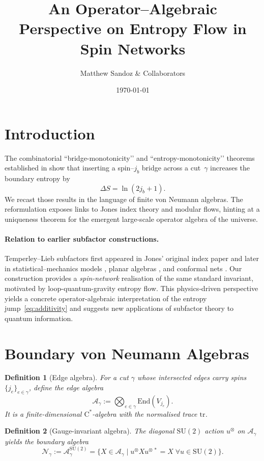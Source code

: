 \documentclass[11pt]{article}
\newtheorem{definition}{Definition}[section]
\begin{document}
\title{An Operator–Algebraic Perspective on Entropy Flow in Spin Networks}
\author{\small Matthew Sandoz \& Collaborators}
\date{\today}
\maketitle

\section{Introduction}
The combinatorial “bridge-monotonicity’’ and “entropy-monotonicity’’ theorems
established in \cite{BridgeMono,EntropyMono}
show that inserting a spin–$j_b$ bridge across a cut~$\gamma$ increases the
boundary entropy by
\[
  \Delta S = \ln(2j_b+1).
\]
We recast those results in the language of finite von Neumann algebras.  
The reformulation exposes links to Jones index theory and modular flows, hinting
at a uniqueness theorem for the emergent large-scale operator algebra of the
universe.

\paragraph{Relation to earlier subfactor constructions.}
Temperley--Lieb subfactors first appeared in Jones’ original index
paper \cite{Jones1983} and later in statistical–mechanics models
\cite{KauffmanLins}, planar algebras \cite{JonesPA}, and conformal nets
\cite{KawahigashiLongo}.  
Our construction provides a \emph{spin-network} realisation of the same
standard invariant, motivated by loop-quantum-gravity entropy flow.
This physics‐driven perspective yields a concrete operator-algebraic
interpretation of the entropy jump~\eqref{eq:additivity} and suggests
new applications of subfactor theory to quantum information.


\section{Boundary von Neumann Algebras}

\begin{definition}[Edge algebra]
For a cut $\gamma$ whose intersected edges carry spins
$\{j_e\}_{e\in\gamma}$, define the \emph{edge algebra}
\[
  \mathcal A_{\gamma} := \bigotimes_{e\in\gamma} \mathrm{End}(V_{j_e}).
\]
It is a finite-dimensional $\mathrm C^\ast$-algebra with the normalised trace
$\mathrm{tr}$.
\end{definition}

\begin{definition}[Gauge-invariant algebra]
The diagonal $\mathrm{SU}(2)$ action $u^{\otimes}$ on
$\mathcal A_\gamma$ yields the \emph{boundary algebra}
\[
  \mathcal N_{\gamma} := 
  \mathcal A_{\gamma}^{\mathrm{SU}(2)}
  =
  \{X\in\mathcal A_{\gamma}\mid
    u^{\otimes} X u^{\otimes\,*}=X\;\forall u\in \mathrm{SU}(2)\}.
\]
\end{definition}
\end{document}
